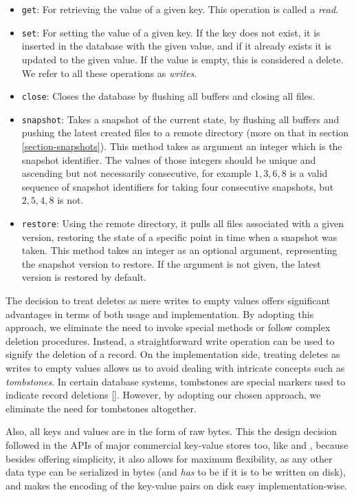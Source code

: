\begin{itemize}
    \item \verb"get": For retrieving the value of a given key. This operation is called a \textit{read}.
    \item \verb"set": For setting the value of a given key. If the key does not exist, it is inserted in the database with the given value, and if it already exists it is updated to the given value. If the value is empty, this is considered a delete. We refer to all these operations as \textit{writes}.
    \item \verb"close": Closes the database by flushing all buffers and closing all files.
    \item \verb"snapshot": Takes a snapshot of the current state, by flushing all buffers and pushing the latest created files to a remote directory (more on that in section \ref{section-snapshots}). This method takes as argument an integer which is the snapshot identifier. The values of those integers should be unique and ascending but not necessarily consecutive, for example $1, 3, 6, 8$ is a valid sequence of snapshot identifiers for taking four consecutive snapshots, but $2, 5, 4, 8$ is not.

    \item \verb"restore": Using the remote directory, it pulls all files  associated with a given version, restoring the state of a specific point in time when a snapshot was taken. This method takes an integer as an optional argument, representing the snapshot version to restore. If the argument is not given, the latest version is restored by default.
\end{itemize}

The decision to treat deletes as mere writes to empty values offers significant advantages in terms of both usage and implementation. By adopting this approach, we eliminate the need to invoke special methods or follow complex deletion procedures. Instead, a straightforward write operation can be used to signify the deletion of a record. On the implementation side, treating deletes as writes to empty values allows us to avoid dealing with intricate concepts such as \textit{tombstones}. In certain database systems, tombstones are special markers used to indicate record deletions [\cite{myrocks}]. However, by adopting our chosen approach, we eliminate the need for tombstones altogether.

Also, all keys and values are in the form of raw bytes. This the design decision followed in the APIs of major commercial key-value stores too, like \cite{rocksdb} and \cite{redis}, because besides offering simplicity, it also allows for maximum flexibility, as any other data type can be serialized in bytes (and \textit{has} to be if it is to be written on disk), and makes the encoding of the key-value pairs on disk easy implementation-wise.

